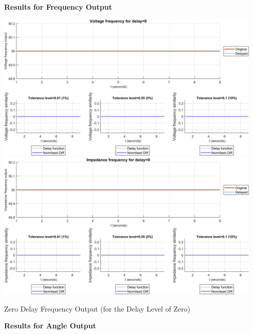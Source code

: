   
\newpage \textbf{Results for Frequency Output}

\begin{floatingfigure}[p]{\textwidth}
    \includegraphics[width=0.95\textwidth]{PMUsim-figures/DelayOf_0/Zero_vFrequency.png}    
    \includegraphics[width=0.95\textwidth]{PMUsim-figures/DelayOf_0/Zero_iFrequency.png}    
    \caption{Zero Delay Frequency Output (for the Delay Level of Zero)}
    \label{fig:PMUsim_Zero_Frequency}
	\end{floatingfigure}


\newpage \textbf{Results for Angle Output}

